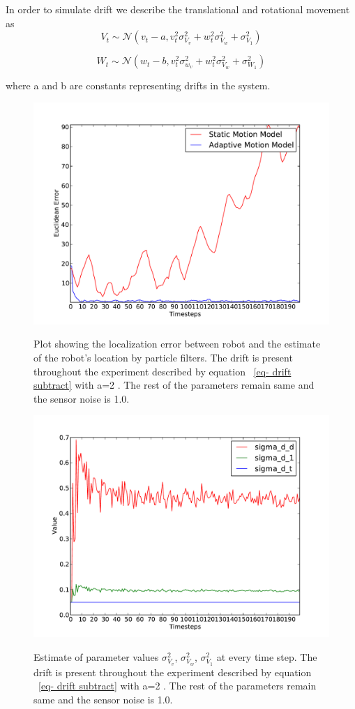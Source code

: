 \documentclass[12pt]{dalcsthesis}
\begin{document}
In order to simulate drift we describe the translational and rotational movement as
\begin{equation}
\label{eq- drift subtract}
V_{t}\sim\mathcal{{N}}(v_{t}-a,v_{t}^{2}\sigma_{V_{v}}^{2}+w_{t}^{2}\sigma_{V_{w}}^{2}+\sigma_{V_{1}}^{2})
\end{equation}

\begin{equation}
W_{t}\sim\mathcal{{N}}(w_{t}-b,v_{t}^{2}\sigma_{w_{v}}^{2}+w_{t}^{2}\sigma_{V_{w}}^{2}+\sigma_{W_{1}}^{2})
\end{equation}


where a and b are constants representing drifts in the system. 

\begin{figure}
  \centering
     {\includegraphics[height = 3.0 in]{./plots/200_005_005_s_10_traj_3_drift_20.pdf}}
  \caption{\label{fig-drift_2.0} Plot showing the localization error between robot and the estimate of the robot's location by particle filters. The drift is present throughout the experiment described by equation ~\ref{eq- drift subtract} with a=2 . The rest of the parameters remain same and the sensor noise is 1.0.}
\end{figure}
   
   
\begin{figure}
  \centering
     {\includegraphics[height = 3.0 in]{./plots/200_005_005_s_10_traj_3_drift_20_motion_model_trans.pdf}}
  \caption{\label{fig-drift_motion_model_1.0_trans} Estimate of parameter values $\sigma_{V_{v}}^{2}$, $\sigma_{V_{w}}^{2}$,  $\sigma_{V_{1}}^{2}$ at every time step. The drift is present throughout the experiment described by equation ~\ref{eq- drift subtract} with a=2 . The rest of the parameters remain same and the sensor noise is 1.0.}
\end{figure}
\end{document}
